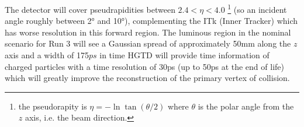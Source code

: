 The detector will cover pseudrapidities between $2.4 < \eta < 4.0$ \footnote{the pseudorapity is $\eta=-\ln \tan(\theta/2)$ where $\theta$ is the polar angle from the $z$ axis, i.e. the beam direction.} (so an incident angle roughly between 2° and 10°), complementing the ITk (Inner Tracker) which has worse resolution in this forward region. The luminous region in the nominal scenario for Run 3 will see a Gaussian spread of approximately 50mm along the $z$ axis and a width of 175$\si{ps}$ in time %
HGTD will provide time information of charged particles with a time resolution of 30ps (up to 50ps at the end of life) which will greatly improve the reconstruction of the primary vertex of collision.


